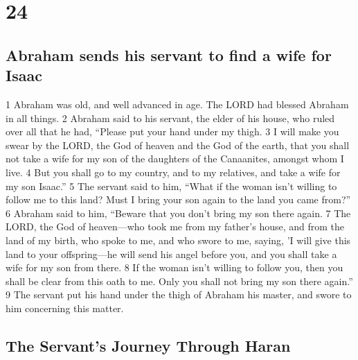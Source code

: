 \hypertarget{section-23}{%
\section{24}\label{section-23}}

\hypertarget{abraham-sends-his-servant-to-find-a-wife-for-isaac}{%
\subsection{Abraham sends his servant to find a wife for
Isaac}\label{abraham-sends-his-servant-to-find-a-wife-for-isaac}}

{1} Abraham was old, and well advanced in age. The LORD had blessed
Abraham in all things. {2} Abraham said to his servant, the elder of his
house, who ruled over all that he had, ``Please put your hand under my
thigh. {3} I will make you swear by the LORD, the God of heaven and the
God of the earth, that you shall not take a wife for my son of the
daughters of the Canaanites, amongst whom I live. {4} But you shall go
to my country, and to my relatives, and take a wife for my son Isaac.''
{5} The servant said to him, ``What if the woman isn't willing to follow
me to this land? Must I bring your son again to the land you came
from?'' {6} Abraham said to him, ``Beware that you don't bring my son
there again. {7} The LORD, the God of heaven---who took me from my
father's house, and from the land of my birth, who spoke to me, and who
swore to me, saying, 'I will give this land to your offspring---he will
send his angel before you, and you shall take a wife for my son from
there. {8} If the woman isn't willing to follow you, then you shall be
clear from this oath to me. Only you shall not bring my son there
again.'' {9} The servant put his hand under the thigh of Abraham his
master, and swore to him concerning this matter.

\hypertarget{the-servants-journey-through-haran}{%
\subsection{The Servant's Journey Through
Haran}\label{the-servants-journey-through-haran}}

